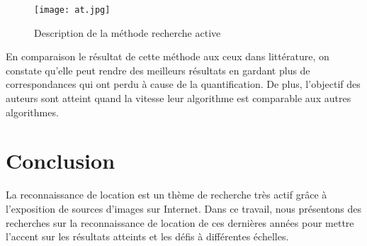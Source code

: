 \documentclass[journal]{IEEEtran}
\begin{document}
\begin{figure}[t]
    \centering
	\texttt{[image: at.jpg]}
    \caption{Description de la méthode recherche active} %
    \label{fig:aat}
\end{figure}

En comparaison le résultat de cette méthode aux ceux dans littérature, on constate 
qu'elle peut rendre des meilleurs résultats en gardant plus de correspondances qui ont 
perdu à cause de la quantification. De plus, l'objectif des auteurs sont atteint quand 
la vitesse leur algorithme est comparable aux autres algorithmes.

\section{Conclusion}
La reconnaissance de location est un thème de recherche très actif grâce à l'exposition 
de sources d'images sur Internet. Dans ce travail, nous présentons des recherches sur la 
reconnaissance de location de ces dernières années pour mettre l'accent sur les résultats 
atteints et les défis à différentes échelles.
\nocite{*}
\printbibliography
\end{document}
